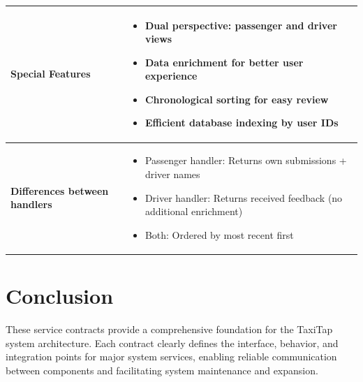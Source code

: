 \documentclass[11pt,a4paper]{article}
\begin{document}
\begin{longtable}{|p{4cm}|p{12cm}|}
\hline
\textbf{Special Features} & 
\begin{itemize}[nosep]
\item Dual perspective: passenger and driver views
\item Data enrichment for better user experience
\item Chronological sorting for easy review
\item Efficient database indexing by user IDs
\end{itemize} \\
\hline
\textbf{Differences between handlers} & 
\begin{itemize}[nosep]
\item Passenger handler: Returns own submissions + driver names
\item Driver handler: Returns received feedback (no additional enrichment)
\item Both: Ordered by most recent first
\end{itemize} \\
\hline
\end{longtable}

\section{Conclusion}

These service contracts provide a comprehensive foundation for the TaxiTap system architecture. Each contract clearly defines the interface, behavior, and integration points for major system services, enabling reliable communication between components and facilitating system maintenance and expansion.
\end{document}
